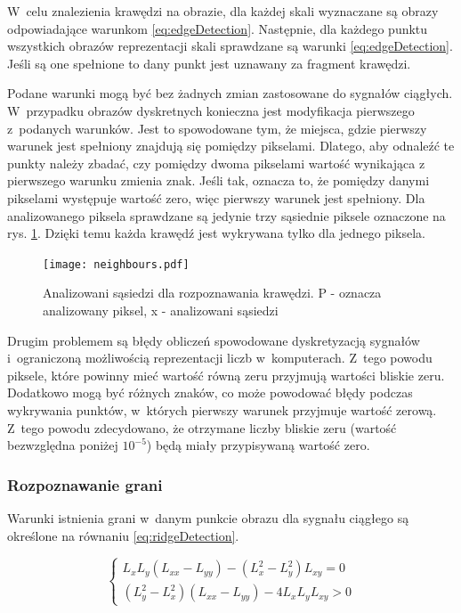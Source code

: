 W~celu znalezienia krawędzi na obrazie, dla każdej skali wyznaczane są obrazy odpowiadające warunkom \eqref{eq:edgeDetection}. Następnie, dla każdego punktu wszystkich obrazów reprezentacji skali sprawdzane są warunki \eqref{eq:edgeDetection}. Jeśli są one spełnione to dany punkt jest uznawany za fragment krawędzi.

Podane warunki mogą być bez żadnych zmian zastosowane do sygnałów ciągłych. W~przypadku obrazów dyskretnych konieczna jest modyfikacja pierwszego z~podanych warunków. Jest to spowodowane tym, że miejsca, gdzie pierwszy warunek jest spełniony znajdują się pomiędzy pikselami. Dlatego, aby odnaleźć te punkty należy zbadać, czy pomiędzy dwoma pikselami wartość wynikająca z pierwszego warunku zmienia znak. Jeśli tak, oznacza to, że pomiędzy danymi pikselami występuje wartość zero, więc pierwszy warunek jest spełniony. Dla analizowanego piksela sprawdzane są jedynie trzy sąsiednie piksele oznaczone na rys. \ref{fig:comparePixels}. Dzięki temu każda krawędź jest wykrywana tylko dla jednego piksela.

\begin{figure}
\begin{center}
\texttt{[image: neighbours.pdf]}
\end{center}
\caption{Analizowani sąsiedzi dla rozpoznawania krawędzi. P - oznacza analizowany piksel, x - analizowani sąsiedzi}
\label{fig:comparePixels}
\end{figure}

Drugim problemem są błędy obliczeń spowodowane dyskretyzacją sygnałów i~ograniczoną możliwością reprezentacji liczb w~komputerach. Z~tego powodu piksele, które powinny mieć wartość równą zeru przyjmują wartości bliskie zeru. Dodatkowo mogą być różnych znaków, co może powodować błędy podczas wykrywania punktów, w~których pierwszy warunek przyjmuje wartość zerową. Z~tego powodu zdecydowano, że otrzymane liczby bliskie zeru (wartość bezwzględna poniżej $ 10^{-5} $) będą miały przypisywaną wartość zero.


\subsubsection{Rozpoznawanie grani}
\label{subsubsec:rozpoznawanieGrani}

Warunki istnienia grani w~danym punkcie obrazu dla sygnału ciągłego są określone na równaniu \eqref{eq:ridgeDetection}.

\begin{equation}
\label{eq:ridgeDetection}
\left\{ \begin{array}{rl}
L_xL_y(L_{xx}-L_{yy}) - (L_x^2 - L_y^2)L_{xy} = 0 \\
(L_y^2 - L_x^2)(L_{xx} - L_{yy}) - 4 L_xL_yL_{xy} > 0
\end{array} \right.
\end{equation}

